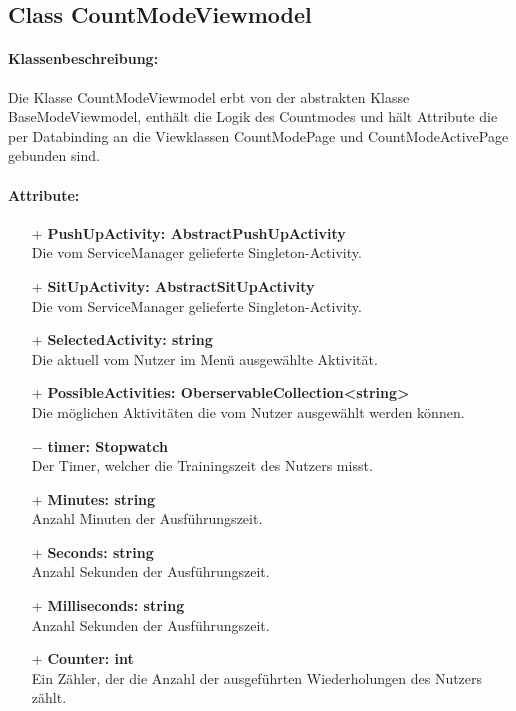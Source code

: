 \documentclass[a4paper,12pt]{article}
\begin{document}
\subsection{Class CountModeViewmodel}
\paragraph{Klassenbeschreibung:}
Die Klasse CountModeViewmodel erbt von der abstrakten Klasse BaseModeViewmodel, enthält die Logik des Countmodes und hält Attribute die per Databinding an die Viewklassen CountModePage und CountModeActivePage gebunden sind.
\paragraph{Attribute:}
\begin{itemize}
	\item[+] \textbf{PushUpActivity: AbstractPushUpActivity} \\ Die vom ServiceManager gelieferte Singleton-Activity.
	\item[+] \textbf{SitUpActivity: AbstractSitUpActivity} \\ Die vom ServiceManager gelieferte Singleton-Activity.
	\item[+] \textbf{SelectedActivity: string} \\ Die aktuell vom Nutzer im Menü ausgewählte Aktivität. 
	\item[+] \textbf{PossibleActivities: OberservableCollection<string>} \\ Die möglichen Aktivitäten die vom Nutzer ausgewählt werden können. 
	\item[$-$] \textbf{timer: Stopwatch} \\ Der Timer, welcher die Trainingszeit des Nutzers misst. 
	\item[+] \textbf{Minutes: string} \\ Anzahl Minuten der Ausführungszeit. 
	\item[+] \textbf{Seconds: string} \\ Anzahl Sekunden der Ausführungszeit. 
	\item[+] \textbf{Milliseconds: string} \\ Anzahl Sekunden der Ausführungszeit. 
	\item[+] \textbf{Counter: int} \\ Ein Zähler, der die Anzahl der ausgeführten Wiederholungen des Nutzers zählt. 
\end{itemize}
\end{document}
